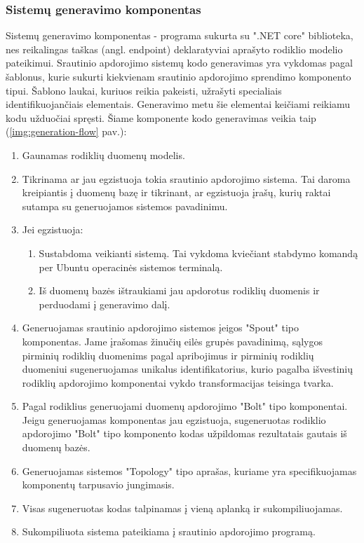 \documentclass{VUMIFPSbakalaurinis}
\begin{document}
\subsubsection{Sistemų generavimo komponentas}

Sistemų generavimo komponentas - programa sukurta su ".NET core" biblioteka, nes reikalingas taškas (angl. endpoint) deklaratyviai aprašyto rodiklio modelio pateikimui. Srautinio apdorojimo sistemų kodo generavimas yra vykdomas pagal šablonus, kurie sukurti kiekvienam srautinio apdorojimo sprendimo komponento tipui. Šablono laukai, kuriuos reikia pakeisti, užrašyti specialiais identifikuojančiais elementais. Generavimo metu šie elementai keičiami reikiamu kodu užduočiai spręsti.
Šiame komponente kodo generavimas veikia taip (\ref{img:generation-flow} pav.):

\begin{enumerate}
    \item Gaunamas rodiklių duomenų modelis.
    \item Tikrinama ar jau egzistuoja tokia srautinio apdorojimo sistema. Tai daroma kreipiantis į duomenų bazę ir tikrinant, ar egzistuoja įrašų, kurių raktai sutampa su generuojamos sistemos pavadinimu.
    \item Jei egzistuoja:
        \begin{enumerate}
            \item Sustabdoma veikianti sistemą. Tai vykdoma kviečiant stabdymo komandą per Ubuntu operacinės sistemos terminalą.
            \item Iš duomenų bazės ištraukiami jau apdorotus rodiklių duomenis ir perduodami į generavimo dalį.
        \end{enumerate} 
    \item Generuojamas srautinio apdorojimo sistemos įeigos "Spout" tipo komponentas. Jame įrašomas žinučių eilės grupės pavadinimą, sąlygos pirminių rodiklių duomenims pagal apribojimus ir pirminių rodiklių duomeniui sugeneruojamas unikalus identifikatorius, kurio pagalba išvestinių rodiklių apdorojimo komponentai vykdo transformacijas teisinga tvarka.
    \item Pagal rodiklius generuojami duomenų apdorojimo "Bolt" tipo komponentai. Jeigu generuojamas komponentas jau egzistuoja, sugeneruotas rodiklio apdorojimo "Bolt" tipo komponento kodas užpildomas rezultatais gautais iš duomenų bazės. 
    \item Generuojamas sistemos "Topology" tipo aprašas, kuriame yra specifikuojamas komponentų tarpusavio jungimasis. 
    \item Visas sugeneruotas kodas talpinamas į vieną aplanką ir sukompiliuojamas.
    \item Sukompiliuota sistema pateikiama į srautinio apdorojimo programą.
\end{enumerate}
\end{document}
